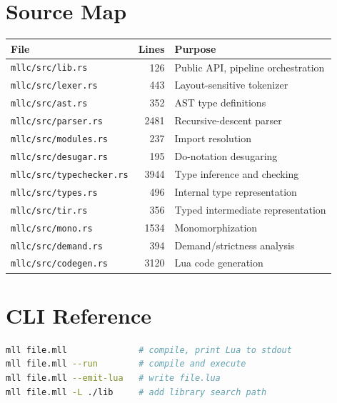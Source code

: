 \documentclass[11pt,a4paper]{article}
\begin{document}
\section{Source Map}

\begin{tabular}{@{}lrl@{}}
\toprule
\textbf{File} & \textbf{Lines} & \textbf{Purpose} \\
\midrule
\texttt{mllc/src/lib.rs}          & 126  & Public API, pipeline orchestration \\
\texttt{mllc/src/lexer.rs}        & 443  & Layout-sensitive tokenizer \\
\texttt{mllc/src/ast.rs}          & 352  & AST type definitions \\
\texttt{mllc/src/parser.rs}       & 2481 & Recursive-descent parser \\
\texttt{mllc/src/modules.rs}      & 237  & Import resolution \\
\texttt{mllc/src/desugar.rs}      & 195  & Do-notation desugaring \\
\texttt{mllc/src/typechecker.rs}  & 3944 & Type inference and checking \\
\texttt{mllc/src/types.rs}        & 496  & Internal type representation \\
\texttt{mllc/src/tir.rs}          & 356  & Typed intermediate representation \\
\texttt{mllc/src/mono.rs}         & 1534 & Monomorphization \\
\texttt{mllc/src/demand.rs}       & 394  & Demand/strictness analysis \\
\texttt{mllc/src/codegen.rs}      & 3120 & Lua code generation \\
\bottomrule
\end{tabular}

\section{CLI Reference}

\begin{lstlisting}[language=bash]
mll file.mll              # compile, print Lua to stdout
mll file.mll --run        # compile and execute
mll file.mll --emit-lua   # write file.lua
mll file.mll -L ./lib     # add library search path
\end{lstlisting}
\end{document}
